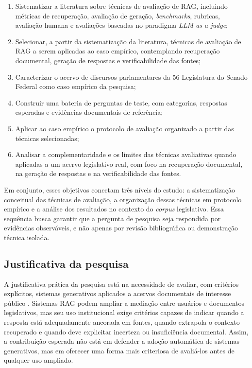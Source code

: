 \begin{enumerate}
  \item Sistematizar a literatura sobre técnicas de avaliação de RAG, incluindo métricas de recuperação, avaliação de geração, \textit{benchmarks}, rubricas, avaliação humana e avaliações baseadas no paradigma \textit{LLM-as-a-judge};
  \item Selecionar, a partir da sistematização da literatura, técnicas de avaliação de RAG a serem aplicadas ao caso empírico, contemplando recuperação documental, geração de respostas e verificabilidade das fontes;
  \item Caracterizar o acervo de discursos parlamentares da 56\textordfeminine{} Legislatura do Senado Federal como caso empírico da pesquisa;
  \item Construir uma bateria de perguntas de teste, com categorias, respostas esperadas e evidências documentais de referência;
  \item Aplicar ao caso empírico o protocolo de avaliação organizado a partir das técnicas selecionadas;
  \item Analisar a complementaridade e os limites das técnicas avaliativas quando aplicadas a um acervo legislativo real, com foco na recuperação documental, na geração de respostas e na verificabilidade das fontes.
\end{enumerate}

Em conjunto, esses objetivos conectam três níveis do estudo: a sistematização conceitual das técnicas de avaliação, a organização dessas técnicas em protocolo empírico e a análise dos resultados no contexto do \textit{corpus} legislativo. Essa sequência busca garantir que a pergunta de pesquisa seja respondida por evidências observáveis, e não apenas por revisão bibliográfica ou demonstração técnica isolada.

\subsection{Justificativa da pesquisa}

A justificativa prática da pesquisa está na necessidade de avaliar, com critérios explícitos, sistemas generativos aplicados a acervos documentais de interesse público \parencite{wfd2023guidelinesAiParliaments,ipu2024aiParliaments,deAlmeidaSantos2025aiGovernance}. Sistemas RAG podem ampliar a mediação entre usuários e documentos legislativos, mas seu uso institucional exige critérios capazes de indicar quando a resposta está adequadamente ancorada em fontes, quando extrapola o contexto recuperado e quando deve explicitar incerteza ou insuficiência documental. Assim, a contribuição esperada não está em defender a adoção automática de sistemas generativos, mas em oferecer uma forma mais criteriosa de avaliá-los antes de qualquer uso ampliado.

